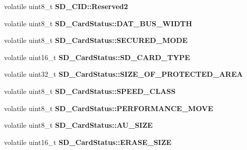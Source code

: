 \begin{DoxyCompactItemize}
\item 
volatile uint8\+\_\+t {\bfseries S\+D\+\_\+\+C\+I\+D\+::\+Reserved2}\hypertarget{group__sd__card_ga7e3ba2aaed5d569ac75fd24ddb6d73d5}{}\label{group__sd__card_ga7e3ba2aaed5d569ac75fd24ddb6d73d5}

\item 
volatile uint8\+\_\+t {\bfseries S\+D\+\_\+\+Card\+Status\+::\+D\+A\+T\+\_\+\+B\+U\+S\+\_\+\+W\+I\+D\+TH}\hypertarget{group__sd__card_gac3c5d7c0938feed59e8e79f2a694b9dc}{}\label{group__sd__card_gac3c5d7c0938feed59e8e79f2a694b9dc}

\item 
volatile uint8\+\_\+t {\bfseries S\+D\+\_\+\+Card\+Status\+::\+S\+E\+C\+U\+R\+E\+D\+\_\+\+M\+O\+DE}\hypertarget{group__sd__card_ga3d68bc70456708b430a7eaae97fda0d9}{}\label{group__sd__card_ga3d68bc70456708b430a7eaae97fda0d9}

\item 
volatile uint16\+\_\+t {\bfseries S\+D\+\_\+\+Card\+Status\+::\+S\+D\+\_\+\+C\+A\+R\+D\+\_\+\+T\+Y\+PE}\hypertarget{group__sd__card_ga400d54eab48ecfef2d8dc7a3b6271976}{}\label{group__sd__card_ga400d54eab48ecfef2d8dc7a3b6271976}

\item 
volatile uint32\+\_\+t {\bfseries S\+D\+\_\+\+Card\+Status\+::\+S\+I\+Z\+E\+\_\+\+O\+F\+\_\+\+P\+R\+O\+T\+E\+C\+T\+E\+D\+\_\+\+A\+R\+EA}\hypertarget{group__sd__card_gae9ef610dc047b17a4b6da4309e2163a1}{}\label{group__sd__card_gae9ef610dc047b17a4b6da4309e2163a1}

\item 
volatile uint8\+\_\+t {\bfseries S\+D\+\_\+\+Card\+Status\+::\+S\+P\+E\+E\+D\+\_\+\+C\+L\+A\+SS}\hypertarget{group__sd__card_gaefcdb19028ffb65e00489c6943c043e4}{}\label{group__sd__card_gaefcdb19028ffb65e00489c6943c043e4}

\item 
volatile uint8\+\_\+t {\bfseries S\+D\+\_\+\+Card\+Status\+::\+P\+E\+R\+F\+O\+R\+M\+A\+N\+C\+E\+\_\+\+M\+O\+VE}\hypertarget{group__sd__card_ga07235226d6db22e24c4d32c4125b8e7a}{}\label{group__sd__card_ga07235226d6db22e24c4d32c4125b8e7a}

\item 
volatile uint8\+\_\+t {\bfseries S\+D\+\_\+\+Card\+Status\+::\+A\+U\+\_\+\+S\+I\+ZE}\hypertarget{group__sd__card_ga29ae9bd3d8353e0df873e24adebddc9d}{}\label{group__sd__card_ga29ae9bd3d8353e0df873e24adebddc9d}

\item 
volatile uint16\+\_\+t {\bfseries S\+D\+\_\+\+Card\+Status\+::\+E\+R\+A\+S\+E\+\_\+\+S\+I\+ZE}\hypertarget{group__sd__card_ga868572db9f24ce2075e65357e056e3d4}{}\label{group__sd__card_ga868572db9f24ce2075e65357e056e3d4}


\end{DoxyCompactItemize}
